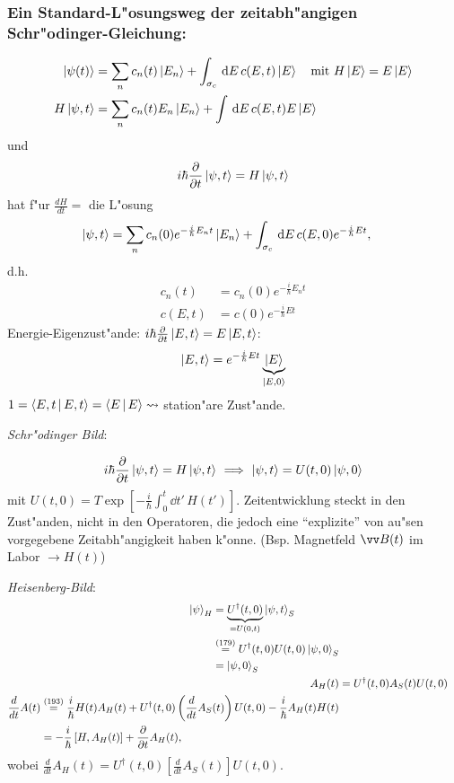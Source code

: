 \documentclass[a4paper]{scrartcl}
\begin{document}
{\subsubsection*{Ein Standard-L"osungsweg der zeitabh"angigen Schr"odinger-Gleichung:}
\begin{align*}
\Ket{ \psi(t) } & = \sum_n c_n(t) \Ket{ E_n} + \int_{\sigma_c} \, \mathrm{d} E \, c(E, t) \Ket{E} \quad \mathrm{ mit \ } H \Ket{E} = E \Ket{E} \\
H \Ket{ \psi, t} & = \sum_n c_n(t) E_n \Ket{ E_n } + \int \, \mathrm{d} E \, c(E,t) E \Ket E
\end{align*}
und
$$i \hbar \frac \partial {\partial t} \Ket{ \psi, t} = H \Ket{ \psi, t}$$
hat f"ur $\frac {dH}{dt} = $ die L"osung
\begin{align}
\Ket{ \psi, t} & = \sum_n c_n(0) e^{- \frac i \hbar E_n t} \Ket{ E_n} + \int_{\sigma_c} \, \mathrm{d} E \, c(E, 0) e^{- \frac i \hbar E t},
\end{align}
d.h.
\begin{align*}
c_n(t) & = c_n(0) e^{- \frac i \hbar E_n t} \\
c(E,t) & = c(0) e^{- \frac i \hbar E t}
\end{align*}
Energie-Eigenzust"ande: $i \hbar \frac \partial {\partial t} \ket{ E, t} = E \Ket{ E, t}$:
$$\Ket{ E, t} = e^{- \frac i \hbar E t} \underbrace{ \Ket{ E }}_{ \Ket{ E, 0}}$$
$1 = \Braket { E,t | E, t} = \Braket{ E | E} \leadsto$ station"are Zust"ande.

\emph{Schr"odinger Bild}:

\begin{align}
i \hbar \frac{ \partial}{\partial t} \Ket{ \psi, t} = H \Ket{ \psi , t} \ \Longrightarrow \ \Ket{ \psi, t} = U(t,0) \Ket{ \psi, 0}
\end{align}
mit $U(t, 0) = T \exp \left[ - \frac i \hbar \int_0^t \dd t' \, H(t') \right]$. Zeitentwicklung steckt in den Zust"anden, nicht in den Operatoren, die jedoch eine "`explizite"' von au"sen vorgegebene Zeitabh"angigkeit haben k"onne. (Bsp. Magnetfeld $\vv B(t)$ im Labor $\rightarrow H(t)$)

\emph{Heisenberg-Bild}:
\begin{align}
\begin{split}
\Ket \psi_H & = \underbrace{ U^\dagger(t,0)}_{=U(0,t)} \Ket {\psi, t}_S \\
& \stackrel{(179)}= U^\dagger(t,0) U(t,0) \Ket{ \psi, 0}_S \\
& = \Ket{ \psi, 0}_S
\end{split} \\
A_H(t) & = U^\dagger(t,0) A_S(t) U(t,0) \\
\begin{split}
\frac d {dt} A(t) & \stackrel{(193)}= \frac i \hbar H(t) A_H(t) + U^\dagger (t,0) \left( \frac d {dt} A_S(t) \right) U(t,0) - \frac i \hbar A_H(t) H(t) \\
& = - \frac i \hbar \left[ H, A_H(t) \right] + \frac \partial {\partial t} A_H(t),
\end{split}
\end{align}
wobei $\frac d {dt} A_H(t) = U^\dagger(t,0) \left[ \frac d {dt} A_S(t) \right] U(t,0)$.

}
\end{document}
